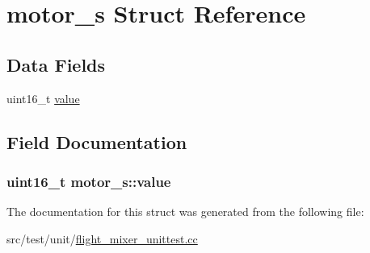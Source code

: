 \hypertarget{structmotor__s}{\section{motor\+\_\+s Struct Reference}
\label{structmotor__s}
}
\subsection*{Data Fields}
\begin{DoxyCompactItemize}
\item 
uint16\+\_\+t \hyperlink{structmotor__s_a02e20b9f25bd1a2564f1fc4232c21e0f}{value}
\end{DoxyCompactItemize}


\subsection{Field Documentation}
\hypertarget{structmotor__s_a02e20b9f25bd1a2564f1fc4232c21e0f}{
\subsubsection[{value}]{\setlength{\rightskip}{0pt plus 5cm}uint16\+\_\+t motor\+\_\+s\+::value}}\label{structmotor__s_a02e20b9f25bd1a2564f1fc4232c21e0f}


The documentation for this struct was generated from the following file\+:\begin{DoxyCompactItemize}
\item 
src/test/unit/\hyperlink{flight__mixer__unittest_8cc}{flight\+\_\+mixer\+\_\+unittest.\+cc}\end{DoxyCompactItemize}
